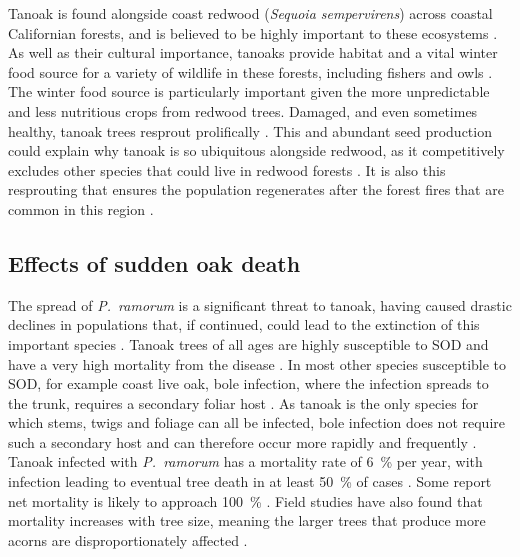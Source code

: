Tanoak is found alongside coast redwood (\textit{Sequoia sempervirens}) across coastal Californian forests, and is believed to be highly important to these ecosystems \citep{noss_redwood_2000}. As well as their cultural importance, tanoaks provide habitat and a vital winter food source for a variety of wildlife in these forests, including fishers and owls \citep{long_recent_2018}. The winter food source is particularly important given the more unpredictable and less nutritious crops from redwood trees. Damaged, and even sometimes healthy, tanoak trees resprout prolifically \citep{tappeiner_lithocarpus_1990}. This and abundant seed production could explain why tanoak is so ubiquitous alongside redwood, as it competitively excludes other species that could live in redwood forests \citep{ramage_forest_2011}. It is also this resprouting that ensures the population regenerates after the forest fires that are common in this region \citep{mcdonald_california_2002, ramage_role_2010}.

\subsection{Effects of sudden oak death}

The spread of \textit{P.~ramorum} is a significant threat to tanoak, having caused drastic declines in populations that, if continued, could lead to the extinction of this important species \citep{mcpherson_responses_2010}. Tanoak trees of all ages are highly susceptible to SOD and have a very high mortality from the disease \citep{davis_preimpact_2010}. In most other species susceptible to SOD, for example coast live oak, bole infection, where the infection spreads to the trunk, requires a secondary foliar host \citep{rizzo_phytophthora_2005}. As tanoak is the only species for which stems, twigs and foliage can all be infected, bole infection does not require such a secondary host and can therefore occur more rapidly and frequently \citep{rizzo_sudden_2003}. Tanoak infected with \textit{P.~ramorum} has a mortality rate of \SI{6}{\percent} per year, with infection leading to eventual tree death in at least \SI{50}{\percent} of cases \citep{mcpherson_responses_2010}. Some report net mortality is likely to approach \SI{100}{\percent} \citep{ramage_sudden_2010}. Field studies have also found that mortality increases with tree size, meaning the larger trees that produce more acorns are disproportionately affected \citep{cobb_ecosystem_2012}.

